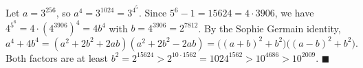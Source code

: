 Let $a=3^{256}$, so $a^4=3^{1024}=3^{4^5}$. Since $5^6-1=15624=4\cdot3906$, we have $4^{5^6}=4\cdot\left(4^{3906}\right)^4=4b^4$ with $b=4^{3906}=2^{7812}$. By the Sophie Germain identity,
\[a^4+4b^4=(a^2+2b^2+2ab)(a^2+2b^2-2ab)=\bigl((a+b)^2+b^2\bigr)\bigl((a-b)^2+b^2\bigr).\]
Both factors are at least $b^2=2^{15624}>2^{10\cdot1562}=1024^{1562}>10^{4686}>10^{2009}$. $\blacksquare$
